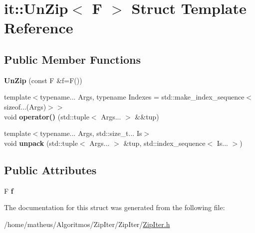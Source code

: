 \hypertarget{structit_1_1UnZip}{}\section{it\+:\+:Un\+Zip$<$ F $>$ Struct Template Reference}
\label{structit_1_1UnZip}
\subsection*{Public Member Functions}
\begin{DoxyCompactItemize}
\item 
{\bfseries Un\+Zip} (const F \&f=F())\hypertarget{structit_1_1UnZip_a21fbbb6ddb2d399169b3512fcbca9ed5}{}\label{structit_1_1UnZip_a21fbbb6ddb2d399169b3512fcbca9ed5}

\item 
{\footnotesize template$<$typename... Args, typename Indexes  = std\+::make\+\_\+index\+\_\+sequence$<$sizeof...(\+Args)$>$$>$ }\\void {\bfseries operator()} (std\+::tuple$<$ Args... $>$ \&\&tup)\hypertarget{structit_1_1UnZip_abb8972514c728951bf7aee3fb72e3492}{}\label{structit_1_1UnZip_abb8972514c728951bf7aee3fb72e3492}

\item 
{\footnotesize template$<$typename... Args, std\+::size\+\_\+t... Is$>$ }\\void {\bfseries unpack} (std\+::tuple$<$ Args... $>$ \&tup, std\+::index\+\_\+sequence$<$ Is... $>$)\hypertarget{structit_1_1UnZip_a2b1b825baca1f9910987c33083b7c0f8}{}\label{structit_1_1UnZip_a2b1b825baca1f9910987c33083b7c0f8}

\end{DoxyCompactItemize}
\subsection*{Public Attributes}
\begin{DoxyCompactItemize}
\item 
F {\bfseries f}\hypertarget{structit_1_1UnZip_aeaa4670a22ae9aea446e5d4ce2a1a4e6}{}\label{structit_1_1UnZip_aeaa4670a22ae9aea446e5d4ce2a1a4e6}

\end{DoxyCompactItemize}


The documentation for this struct was generated from the following file\+:\begin{DoxyCompactItemize}
\item 
/home/matheus/\+Algoritmos/\+Zip\+Iter/\+Zip\+Iter/\hyperlink{ZipIter_8h}{Zip\+Iter.\+h}\end{DoxyCompactItemize}

